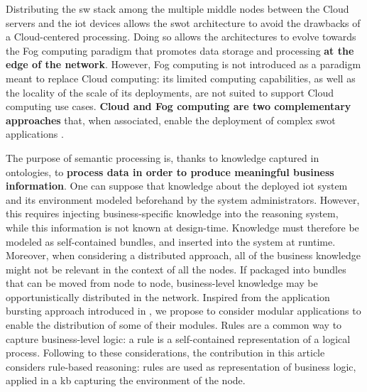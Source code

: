 \documentclass{iosart2c}
\begin{document}
Distributing the \gls{sw} stack among the multiple middle nodes between the Cloud servers and the \gls{iot} devices allows the \gls{swot} architecture to avoid the drawbacks of a Cloud-centered processing.
Doing so allows the architectures to evolve towards the Fog computing paradigm \cite{Bonomi2012} that promotes data storage and processing \textbf{at the edge of the network}\cite{Patel2017}.
However, Fog computing is not introduced as a paradigm meant to replace Cloud computing: its limited computing capabilities, as well as the locality of the scale of its deployments, are not suited to support Cloud computing use cases.
\textbf{Cloud and Fog computing are two complementary approaches} that, when associated, enable the deployment of complex \gls{swot} applications \cite{Sahni2017}.

The purpose of semantic processing is, thanks to knowledge captured in ontologies, to \textbf{process data in order to produce meaningful business information}. 
One can suppose that knowledge about the deployed \gls{iot} system and its environment modeled beforehand by the system administrators.
However, this requires injecting business-specific knowledge into the reasoning system, while this information is not known at design-time.
Knowledge must therefore be modeled as self-contained bundles, and inserted into the system at runtime.
Moreover, when considering a distributed approach, all of the business knowledge might not be relevant in the context of all the nodes. 
If packaged into bundles that can be moved from node to node, business-level knowledge may be opportunistically distributed in the network. 
Inspired from the application bursting approach introduced in \cite{Charrada2016}, we propose to consider modular applications to enable the distribution of some of their modules.
Rules are a common way to capture business-level logic: a rule is a self-contained representation of a logical process.
Following to these considerations, the contribution in this article considers rule-based reasoning: rules are used as representation of business logic, applied in a \gls{kb} capturing the environment of the node.
\end{document}
